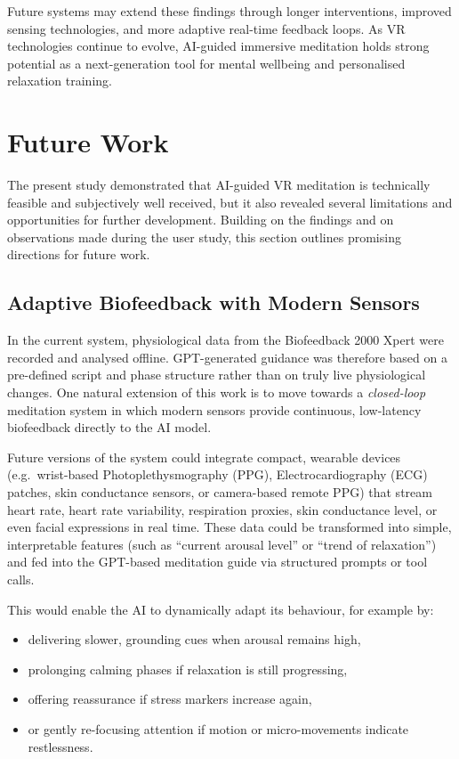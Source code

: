 Future systems may extend these findings through longer interventions, improved
sensing technologies, and more adaptive real-time feedback loops. As VR
technologies continue to evolve, AI-guided immersive meditation holds strong
potential as a next-generation tool for mental wellbeing and personalised
relaxation training.

\chapter{Future Work}

The present study demonstrated that AI-guided VR meditation is technically
feasible and subjectively well received, but it also revealed several
limitations and opportunities for further development. Building on the
findings and on observations made during the user study, this section outlines
promising directions for future work.

\section{Adaptive Biofeedback with Modern Sensors}

In the current system, physiological data from the Biofeedback 2000 Xpert
were recorded and analysed offline. GPT-generated guidance was therefore based
on a pre-defined script and phase structure rather than on truly live
physiological changes. One natural extension of this work is to move towards a
\emph{closed-loop} meditation system in which modern sensors provide
continuous, low-latency biofeedback directly to the AI model.

Future versions of the system could integrate compact, wearable devices
(e.g.\ wrist-based Photoplethysmography (PPG), Electrocardiography (ECG) patches, skin conductance sensors, or
camera-based remote PPG) that stream heart rate, heart rate variability,
respiration proxies, skin conductance level, or even facial expressions in
real time. These data could be transformed into simple, interpretable
features (such as ``current arousal level'' or ``trend of relaxation'') and
fed into the GPT-based meditation guide via structured prompts or tool calls.

This would enable the AI to dynamically adapt its behaviour, for example by:
\begin{itemize}
    \item delivering slower, grounding cues when arousal remains high,
    \item prolonging calming phases if relaxation is still progressing,
    \item offering reassurance if stress markers increase again,
    \item or gently re-focusing attention if motion or micro-movements indicate restlessness.
\end{itemize}

